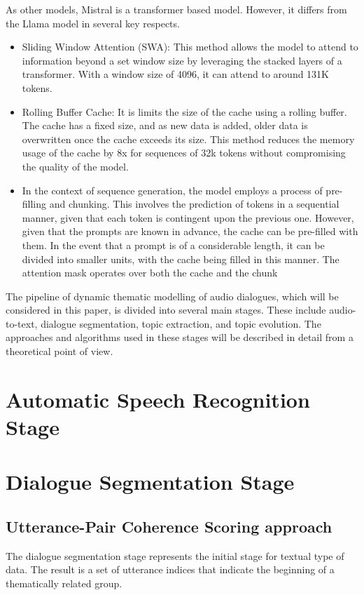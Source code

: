 \documentclass[PMI,VKR]{HSEUniversity}
\begin{document}
As other models, Mistral is a transformer based model. However, it differs from the Llama model in several key respects.
\begin{itemize}
    \item Sliding Window Attention (SWA): This method allows the model to attend to information beyond a set window size by leveraging the stacked layers of a transformer. 
    With a window size of 4096, it can attend to around 131K tokens. 
    \item Rolling Buffer Cache: It is limits the size of the cache using a rolling buffer. The cache has a fixed size, and as new data is added, older data is overwritten once the cache exceeds its size. 
    This method reduces the memory usage of the cache by 8x for sequences of 32k tokens without compromising the quality of the model.
    \item In the context of sequence generation, the model employs a process of pre-filling and chunking. 
    This involves the prediction of tokens in a sequential manner, given that each token is contingent upon the previous one. However, given that the prompts are known in advance, the cache can be pre-filled with them. 
    In the event that a prompt is of a considerable length, it can be divided into smaller units, with the cache being filled in this manner. 
    The attention mask operates over both the cache and the chunk
\end{itemize}


The pipeline of dynamic thematic modelling of audio dialogues, which will be considered in this paper, is divided into several main stages. 
These include audio-to-text, dialogue segmentation, topic extraction, and topic evolution. 
The approaches and algorithms used in these stages will be described in detail from a theoretical point of view.

\section{Automatic Speech Recognition Stage}


\section{Dialogue Segmentation Stage}

\subsection{Utterance-Pair Coherence Scoring approach}
The dialogue segmentation stage represents the initial stage for textual type of data. 
The result is a set of utterance indices that indicate the beginning of a thematically related group. 
\end{document}
